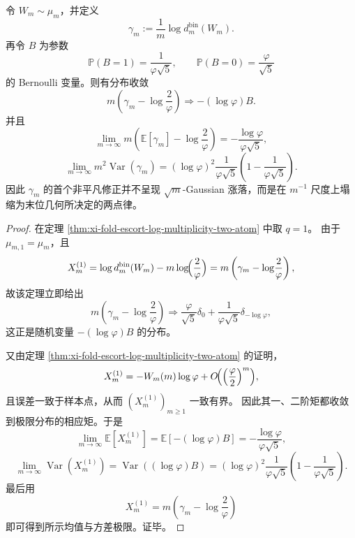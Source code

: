\begin{corollary}[局部信息密度的一阶离散修正律]\label{cor:xi-fold-local-information-density-first-order-discrete-law}
令 \(W_m\sim\mu_m\)，并定义
\[
\gamma_m:=\frac{1}{m}\log d_m^{\mathrm{bin}}(W_m).
\]
再令 \(B\) 为参数
\[
\mathbb P(B=1)=\frac{1}{\varphi\sqrt5},
\qquad
\mathbb P(B=0)=\frac{\varphi}{\sqrt5}
\]
的 Bernoulli 变量。则有分布收敛
\[
m\left(\gamma_m-\log\!\frac{2}{\varphi}\right)
\Longrightarrow
-(\log\varphi)B.
\]
并且
\[
\lim_{m\to\infty}
m\left(\mathbb E[\gamma_m]-\log\!\frac{2}{\varphi}\right)
=
-\frac{\log\varphi}{\varphi\sqrt5},
\]
\[
\lim_{m\to\infty}
m^2\operatorname{Var}(\gamma_m)
=
(\log\varphi)^2
\frac{1}{\varphi\sqrt5}
\left(
1-\frac{1}{\varphi\sqrt5}
\right).
\]
因此 \(\gamma_m\) 的首个非平凡修正并不呈现 \(\sqrt m\)-Gaussian 涨落，而是在 \(m^{-1}\) 尺度上塌缩为末位几何所决定的两点律。
\end{corollary}
\begin{proof}
在定理 \ref{thm:xi-fold-escort-log-multiplicity-two-atom} 中取 \(q=1\)。
由于 \(\mu_{m,1}=\mu_m\)，且
\[
X_m^{(1)}
=
\log d_m^{\mathrm{bin}}(W_m)-m\log\!\Bigl(\frac{2}{\varphi}\Bigr)
=
m\left(\gamma_m-\log\!\frac{2}{\varphi}\right),
\]
故该定理立即给出
\[
m\left(\gamma_m-\log\!\frac{2}{\varphi}\right)
\Longrightarrow
\frac{\varphi}{\sqrt5}\delta_0+\frac{1}{\varphi\sqrt5}\delta_{-\log\varphi},
\]
这正是随机变量 \(-(\log\varphi)B\) 的分布。

又由定理 \ref{thm:xi-fold-escort-log-multiplicity-two-atom} 的证明，
\[
X_m^{(1)}=-W_m(m)\log\varphi+O\!\Bigl(\Bigl(\frac{\varphi}{2}\Bigr)^m\Bigr),
\]
且误差一致于样本点，从而 \((X_m^{(1)})_{m\ge 1}\) 一致有界。
因此其一、二阶矩都收敛到极限分布的相应矩。于是
\[
\lim_{m\to\infty}\mathbb E[X_m^{(1)}]
=
\mathbb E[-(\log\varphi)B]
=
-\frac{\log\varphi}{\varphi\sqrt5},
\]
\[
\lim_{m\to\infty}\operatorname{Var}(X_m^{(1)})
=
\operatorname{Var}((\log\varphi)B)
=
(\log\varphi)^2
\frac{1}{\varphi\sqrt5}
\left(
1-\frac{1}{\varphi\sqrt5}
\right).
\]
最后用
\[
X_m^{(1)}=m\left(\gamma_m-\log\!\frac{2}{\varphi}\right)
\]
即可得到所示均值与方差极限。证毕。
\end{proof}
